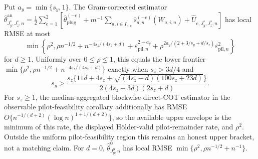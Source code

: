 Put \(a_y=\min\{s_y,1\}\).  The Gram-corrected estimator \(\widehat\theta^{\mathrm{an}}_{J_y^*,J_z^*,n}=\frac12\sum_{e=1}^2[\widehat\theta_{\mathrm{plug}}^{(-e)}+m^{-1}\sum_{a,i\in I_{a,e}}\widehat s_{a,n}^{(-e)}(W_{a,i,n})+\widehat U_{e,J_y^*,J_z^*,n}]\) has local RMSE at most
\[
\min\!\left\{\rho^2,\rho n^{-1/2}+n^{-4s_z/(4s_z+d)}+\varepsilon_{\mathrm{pil},n}^{2+a_y}+\rho^{2a_y/(2+3/s_y+d/s_z)}\varepsilon_{\mathrm{pil},n}^2\right\}
\]
for \(d\ge1\).  Uniformly over \(0\le\rho\le1\), this equals the lower frontier \(\min\{\rho^2,\rho n^{-1/2}+n^{-4s_z/(4s_z+d)}\}\) exactly when \(s_z>3d/4\) and
\[
s_y>\frac{s_z\{11d+4s_z+\sqrt{(4s_z-d)(100s_z+23d)}\}}{2(4s_z-3d)(2s_z+d)}.
\]
For \(s_z\ge1\), the median-aggregated blockwise direct-COT estimator in the observable pilot-feasibility corollary additionally has RMSE \(O\{n^{-1/(d+2)}(\log n)^{1+1/(d+2)}\}\), so the available upper envelope is the minimum of this rate, the displayed H\"older-valid pilot-remainder rate, and \(\rho^2\).  Outside the uniform pilot-feasibility region this remains an honest upper bracket, not a matching claim.  For \(d=0\), \(\widehat\theta^0_{J_y^0,n}\) has local RMSE \(\min\{\rho^2,\rho n^{-1/2}+n^{-1}\}\).